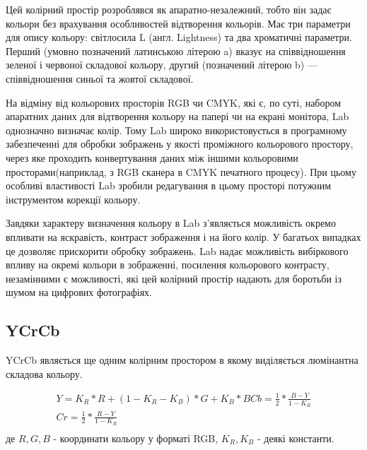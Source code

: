 Цей колірний простір розроблявся як апаратно-незалежний, тобто він задає кольори без врахування особливостей відтворення кольорів. Має три параметри для опису кольору: світлосила L (англ. Lightness) та два хроматичні параметри. Перший (умовно позначений латинською літерою a) вказує на співвідношення зеленої і червоної складової кольору, другий (позначений літерою b) — співвідношення синьої та жовтої складової.

На відміну від кольорових просторів RGB чи CMYK, які є, по суті, набором апаратних даних для відтворення кольору на папері чи на екрані монітора, Lab однозначно визначає колір. Тому Lab широко використовується в програмному забезпеченні для обробки зображень у якості проміжного кольорового простору, через яке проходить конвертування даних між іншими кольоровими просторами(наприклад, з RGB сканера в CMYK печатного процесу). При цьому особливі властивості Lab зробили редагування в цьому просторі потужним інструментом корекції кольору.

Завдяки характеру визначення кольору в Lab з'являється можливість окремо впливати на яскравість, контраст зображення і на його колір. У багатьох випадках це дозволяє прискорити обробку зображень. Lab надає можливість вибіркового впливу на окремі кольори в зображенні, посилення кольорового контрасту, незамінними є можливості, які цей колірний простір надають для боротьби із шумом на цифрових фотографіях.

\subsection{YCrCb}

YCrCb являється ще одним колірним простором в якому виділяється люмінантна складова кольору.

\begin{equation}
	\begin{split}
		Y  = K_{R}*R + ( 1 - K_{R} - K_{B})*G + K_{B}*B
		Cb = \frac{1}{2}*\frac{B-Y}{1 - K_{B}} \\
		Cr = \frac{1}{2}*\frac{R-Y}{1 - K_{R}} \\
	\end{split}
	\label{eq:ycrcb_conversion_rgb}
\end{equation}
де $R,G,B$ - координати кольору у форматі RGB, $K_{R},K_{B}$ - деякі константи.

